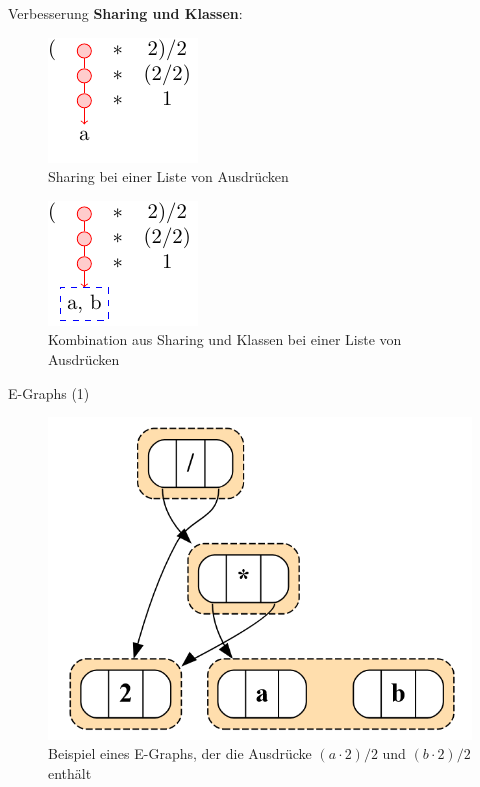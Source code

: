 \begin{frame}{Verbesserung}
    \textbf{Sharing und Klassen}: \vspace{5mm}

    {
\begin{minipage}[c]{0.49\textwidth}
    \begin{figure}[H]
        \centering
        \includegraphics[scale=1.6]{utils/sharing.pdf}
        \caption{Sharing bei einer Liste von Ausdrücken}
        \label{fig:sharing}
    \end{figure}
    \end{minipage}
    \begin{minipage}[c]{0.49\textwidth}
    \begin{figure}[H]
        \centering
        \includegraphics[scale=1.6]{utils/classes.pdf}
        \caption{Kombination aus Sharing und Klassen bei einer Liste von Ausdrücken}
        \label{fig:classes}
    \end{figure}
\end{minipage}}
\end{frame}

\begin{frame}{E-Graphs (1)}
    \begin{figure}[H]
        \centering
        \includegraphics[scale=0.4]{utils/egraph_exp.png}
        \caption{Beispiel eines E-Graphs, der die Ausdrücke $(a \cdot 2) / 2$ und $(b \cdot 2) / 2$ enthält}
        \label{fig:egraphexp}
    \end{figure}
\end{frame}

